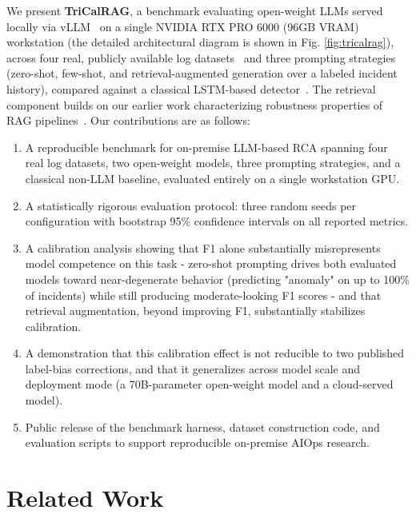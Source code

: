 \documentclass[10pt,conference]{IEEEtran}
\begin{document}
We present \textbf{TriCalRAG}, a benchmark evaluating open-weight
LLMs served locally via vLLM~\cite{vllm2023} on a single NVIDIA RTX PRO
6000 (96GB VRAM) workstation (the detailed architectural diagram is shown in Fig. \ref{fig:tricalrag}), across four real, publicly available log datasets~\cite{loghub} and three prompting strategies (zero-shot, few-shot, and retrieval-augmented generation over a labeled incident history), compared against a classical LSTM-based
detector~\cite{deeplog2017}. The retrieval component builds on our earlier work characterizing robustness properties of RAG
pipelines~\cite{rohitpatel2026trishieldrag}. Our contributions are as follows:
\begin{enumerate}
  \item A reproducible benchmark for on-premise LLM-based RCA spanning
        four real log datasets, two open-weight models, three prompting
        strategies, and a classical non-LLM baseline, evaluated entirely
        on a single workstation GPU.
  \item A statistically rigorous evaluation protocol: three random seeds
        per configuration with bootstrap 95\% confidence intervals on all
        reported metrics.
  \item A calibration analysis showing that F1 alone substantially
        misrepresents model competence on this task - zero-shot
        prompting drives both evaluated models toward near-degenerate
        behavior (predicting "anomaly" on up to 100\% of incidents) while
        still producing moderate-looking F1 scores - and that retrieval
        augmentation, beyond improving F1, substantially stabilizes
        calibration.
  \item A demonstration that this calibration effect is not reducible to
        two published label-bias corrections, and that it generalizes
        across model scale and deployment mode (a 70B-parameter
        open-weight model and a cloud-served model).
  \item Public release of the benchmark harness, dataset construction
        code, and evaluation scripts to support reproducible on-premise
        AIOps research.
\end{enumerate}

\section{Related Work}
\end{document}
